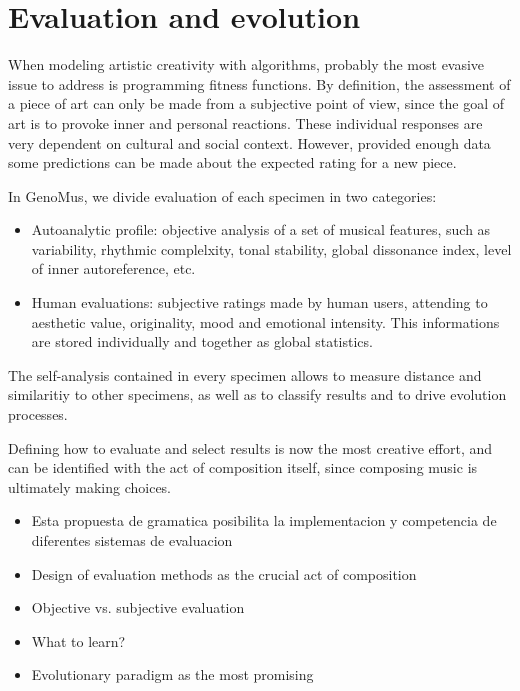 \documentclass{article}
\begin{document}







\section{Evaluation and evolution}

When modeling artistic creativity with algorithms, probably the most evasive issue to address is programming fitness functions. By definition, the assessment of a piece of art can only be made from a subjective point of view, since the goal of art is to provoke inner and personal reactions. These individual responses are very dependent on cultural and social context. However, provided enough data some predictions can be made about the expected rating for a new piece.

In GenoMus, we divide evaluation of each specimen in two categories:

\begin{itemize}
\item Autoanalytic profile: objective analysis of a set of musical features, such as variability, rhythmic complelxity, tonal stability, global dissonance index, level of inner autoreference, etc. 
\item Human evaluations: subjective ratings made by human users, attending to aesthetic value, originality, mood and emotional intensity. This informations are stored individually and together as global statistics.

\end{itemize}

The self-analysis contained in every specimen allows to measure distance and similaritiy to  
other specimens, as well as to classify results and to drive evolution processes.

Defining how to evaluate and select results is now the most creative effort, and can be identified with the act of composition itself, since composing music is ultimately making choices. 


\begin{itemize}
\item Esta propuesta de gramatica posibilita la implementacion y competencia de diferentes sistemas de evaluacion
\item Design of evaluation methods as the crucial act of composition
\item Objective vs. subjective evaluation
\item What to learn?
\item Evolutionary paradigm as the most promising
\end{itemize}
\end{document}
